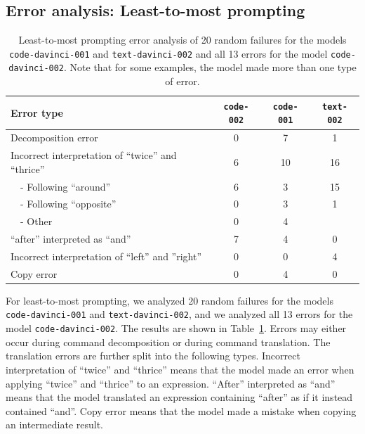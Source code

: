 \subsection{Error analysis: Least-to-most prompting}
\label{app:scan-error}

\begin{table}[h!]
\centering
\begin{tabular}{|l|c|c|c|}
    \hline
    \textbf{Error type} & \texttt{code-002} & \texttt{code-001} & \texttt{text-002} \\
    \hline
    Decomposition error & 0 & 7 & 1\\
    \hline
    Incorrect interpretation of ``twice'' and ``thrice'' & 6 & 10 & 16 \\
    \ \ - Following ``around'' & 6 & 3 & 15\\
    \ \ - Following ``opposite'' & 0 & 3 & 1 \\
    \ \ - Other & 0 & 4 &  \\
    \hline
    ``after'' interpreted as ``and'' & 7 & 4 & 0 \\
    \hline
    Incorrect interpretation of ``left'' and ''right'' & 0 & 0 & 4 \\
    \hline
    Copy error & 0 & 4 & 0 \\
    \hline
\end{tabular}
\vspace{5pt}
\caption{Least-to-most prompting error analysis of 20 random failures for the models \texttt{code-davinci-001} and \texttt{text-davinci-002} and all 13 errors for the model  \texttt{code-davinci-002}. Note that for some examples, the model made more than one type of error.}
\label{table:scan-error-complete}
\end{table}

For least-to-most prompting, we analyzed 20 random failures for the models \texttt{code-davinci-001} and \texttt{text-davinci-002}, and we analyzed all 13 errors for the model \texttt{code-davinci-002}. The results are shown in Table~\ref{table:scan-error-complete}. Errors may either occur during command decomposition or during command translation. The translation errors are further split into the following types. Incorrect interpretation of ``twice'' and ``thrice'' means that the model made an error when applying ``twice'' and ``thrice'' to an expression. ``After'' interpreted as ``and'' means that the model translated an expression containing ``after'' as if it instead contained ``and''. Copy error means that the model made a mistake when copying an intermediate result.

